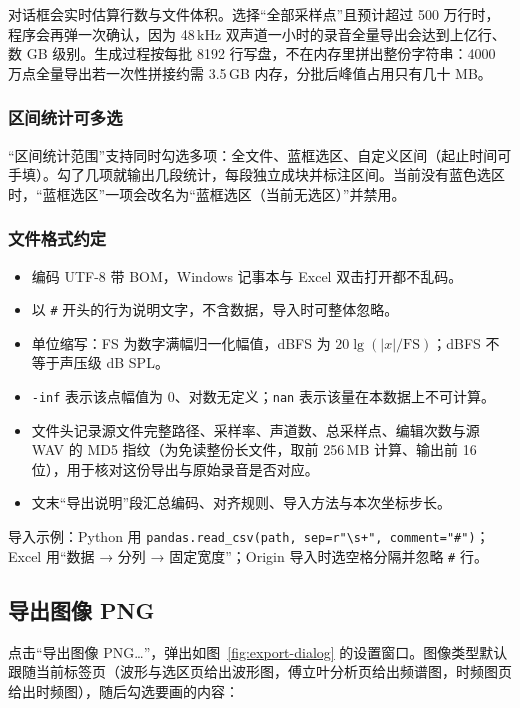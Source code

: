 \documentclass[UTF8,a4paper,12pt,scheme=chinese]{ctexart}
\begin{document}
对话框会实时估算行数与文件体积。选择“全部采样点”且预计超过 500 万行时，程序会再弹一次确认，因为 48\,kHz 双声道一小时的录音全量导出会达到上亿行、数 GB 级别。生成过程按每批 8192 行写盘，不在内存里拼出整份字符串：4000 万点全量导出若一次性拼接约需 3.5\,GB 内存，分批后峰值占用只有几十 MB。

\subsubsection*{区间统计可多选}

“区间统计范围”支持同时勾选多项：全文件、蓝框选区、自定义区间（起止时间可手填）。勾了几项就输出几段统计，每段独立成块并标注区间。当前没有蓝色选区时，“蓝框选区”一项会改名为“蓝框选区（当前无选区）”并禁用。

\subsubsection*{文件格式约定}

\begin{itemize}
  \item 编码 UTF-8 带 BOM，Windows 记事本与 Excel 双击打开都不乱码。
  \item 以 \texttt{\#} 开头的行为说明文字，不含数据，导入时可整体忽略。
  \item 单位缩写：FS 为数字满幅归一化幅值，dBFS 为 $20\lg(|x|/\mathrm{FS})$；dBFS 不等于声压级 dB SPL。
  \item \texttt{-inf} 表示该点幅值为 0、对数无定义；\texttt{nan} 表示该量在本数据上不可计算。
  \item 文件头记录源文件完整路径、采样率、声道数、总采样点、编辑次数与源 WAV 的 MD5 指纹（为免读整份长文件，取前 256\,MB 计算、输出前 16 位），用于核对这份导出与原始录音是否对应。
  \item 文末“导出说明”段汇总编码、对齐规则、导入方法与本次坐标步长。
\end{itemize}

导入示例：Python 用 \texttt{pandas.read\_csv(path, sep=r"\textbackslash s+", comment="\#")}；Excel 用“数据 → 分列 → 固定宽度”；Origin 导入时选空格分隔并忽略 \texttt{\#} 行。

\subsection{导出图像 PNG}

点击“导出图像 PNG…”，弹出如图~\ref{fig:export-dialog} 的设置窗口。图像类型默认跟随当前标签页（波形与选区页给出波形图，傅立叶分析页给出频谱图，时频图页给出时频图），随后勾选要画的内容：
\end{document}
